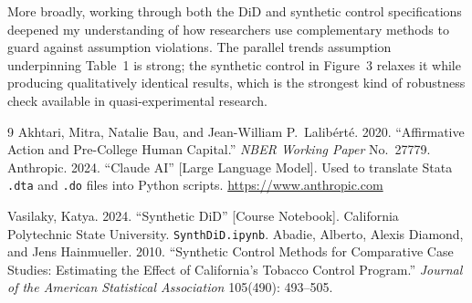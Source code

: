 \documentclass[12pt]{article}
\begin{document}
More broadly, working through both the DiD and synthetic control
specifications deepened my understanding of how researchers use
complementary methods to guard against assumption violations. The parallel
trends assumption underpinning Table~1 is strong; the synthetic control
in Figure~3 relaxes it while producing qualitatively identical results,
which is the strongest kind of robustness check available in
quasi-experimental research.

\begin{thebibliography}{9}
  Akhtari, Mitra, Natalie Bau, and Jean-William P.\ Lalibért{\'e}. 2020.
  ``Affirmative Action and Pre-College Human Capital.''
  \textit{NBER Working Paper} No.\ 27779.
  Anthropic. 2024.
  ``Claude AI'' [Large Language Model].
  Used to translate Stata \texttt{.dta} and \texttt{.do} files into
  Python scripts. \url{https://www.anthropic.com}

  Vasilaky, Katya. 2024.
  ``Synthetic DiD'' [Course Notebook].
  California Polytechnic State University.
  \texttt{SynthDiD.ipynb}.
  Abadie, Alberto, Alexis Diamond, and Jens Hainmueller. 2010.
  ``Synthetic Control Methods for Comparative Case Studies:
  Estimating the Effect of California's Tobacco Control Program.''
  \textit{Journal of the American Statistical Association} 105(490):
  493--505.
\end{thebibliography}
\end{document}
